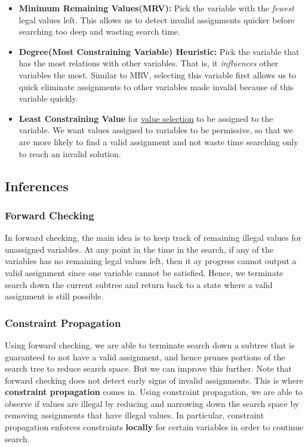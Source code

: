\documentclass[12pt]{article}
\begin{document}
\begin{itemize}
\item \textbf{Minimum Remaining Values(MRV):} Pick the variable with the \textit{fewest} legal values left. This allows us to detect  invalid assignments quicker before searching too deep and wasting search time.
\item \textbf{Degree(Most Constraining Variable) Heuristic:} Pick the variable that has the most relations with other variables. That is, it \textit{influences} other variables the most. Similar to MRV, selecting this variable first allows us to quick eliminate assignments to other variables made invalid because of this variable quickly.
\item \textbf{Least Constraining Value} for \underline{value selection} to be assigned to the variable. We want values assigned to variables to be permissive, so that we are more likely to find a valid assignment and not waste time searching only to reach an invalid solution.
\end{itemize}

\subsection{Inferences}

\subsubsection{Forward Checking}

In forward checking, the main idea is to keep track of remaining illegal values for unassigned variables. At any point in the time in the search, if any of the variables has no remaining legal values left, then it ay progress cannot output a valid assignment since one variable cannot be satisfied. Hence, we terminate search down the current subtree and return back to a state where a valid assignment is still possible.

\subsubsection{Constraint Propagation}

Using forward checking, we are able to terminate search down a subtree that is guaranteed to not have a valid assignment, and hence prunes portions of the search tree to reduce search space. But we can improve this further. Note that forward checking does not detect early signs of invalid assignments. This is where \textbf{constraint propagation} comes in. Using constraint propagation, we are able to observe if values are illegal by reducing and narrowing down the search space by removing assignments that have illegal values. In particular, constraint propagation enforces constraints \textbf{locally} for certain variables in order to continue search.
\end{document}
